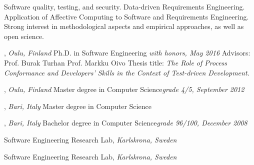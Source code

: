 \documentclass[9pt]{article}
\begin{document}
\noindent Software quality, testing, and security. Data-driven Requirements Engineering. Application of Affective Computing to Software and Requirements Engineering.
Strong interest in methodological aspects and empirical approaches, as well as open science.
\bigskip
\medskip



, \emph{Oulu, Finland} \vspace{0.01in} 
\newline Ph.D. in Software Engineering {\em with honors, May 2016}
\newline Advisors: Prof. Burak Turhan \amper{} Prof. Markku Oivo
\newline Thesis title: {\em The Role of Process Conformance and Developers' Skills in the Context of Test-driven Development.}

\bigskip


, \emph{Oulu, Finland} \vspace{0.01in}  
\newline\noindent Master degree in Computer Science{\em grade 4/5, September 2012}

\bigskip

, \emph{Bari, Italy} \vspace{0.01in}  
\newline\noindent Master degree in Computer Science


\bigskip

, \emph{Bari, Italy} \vspace{0.01in}  
\newline\noindent Bachelor degree in Computer Science{\em grade 96/100, December 2008}

\bigskip
\medskip
{}

\noindent Software Engineering Research Lab, \emph{Karlskrona, Sweden} \vspace{0.01in} 
\newline{}
\bigskip

\noindent Software Engineering Research Lab, \emph{Karlskrona, Sweden} \vspace{0.01in} 
\newline{}
\bigskip
\end{document}
